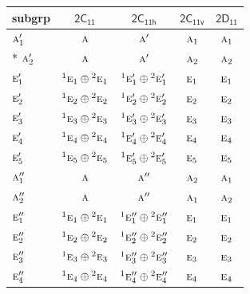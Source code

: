 \documentclass[10pt,a4paper]{article}
\numberwithin{equation}{section}
\newcommand{\grp}[1]{\mathsf{#1}}
\newcommand{\irr}[1]{\text{\normalfont\scshape #1}}
\newcommand{\conjpair}[1]{{}^{#1}}
\begin{document}
{\small\begin{longtable}{@{}lcccc@{}}\toprule
subgrp & \href{2C11.pdf}{$\grp{2C_{11}}$} & \href{2C11h.pdf}{$\grp{2C_{11h}}$} & \href{2C11v.pdf}{$\grp{2C_{11v}}$} & \href{2D11.pdf}{$\grp{2D_{11}}$}\\\midrule\endhead
\bottomrule\endfoot\endlastfoot
$\irr{a}_{1}'$ & $\irr{a}$ & $\irr{a}'$ & $\irr{a}_{1}$ & $\irr{a}_{1}$\\*
$\irr{a}_{2}'$ & $\irr{a}$ & $\irr{a}'$ & $\irr{a}_{2}$ & $\irr{a}_{2}$\\
$\irr{e}_{1}'$ & $\conjpair{1}\irr{e}_{1}\oplus \conjpair{2}\irr{e}_{1}$ & $\conjpair{1}\irr{e}_{1}'\oplus \conjpair{2}\irr{e}_{1}'$ & $\irr{e}_{1}$ & $\irr{e}_{1}$\\
$\irr{e}_{2}'$ & $\conjpair{1}\irr{e}_{2}\oplus \conjpair{2}\irr{e}_{2}$ & $\conjpair{1}\irr{e}_{2}'\oplus \conjpair{2}\irr{e}_{2}'$ & $\irr{e}_{2}$ & $\irr{e}_{2}$\\
$\irr{e}_{3}'$ & $\conjpair{1}\irr{e}_{3}\oplus \conjpair{2}\irr{e}_{3}$ & $\conjpair{1}\irr{e}_{3}'\oplus \conjpair{2}\irr{e}_{3}'$ & $\irr{e}_{3}$ & $\irr{e}_{3}$\\
$\irr{e}_{4}'$ & $\conjpair{1}\irr{e}_{4}\oplus \conjpair{2}\irr{e}_{4}$ & $\conjpair{1}\irr{e}_{4}'\oplus \conjpair{2}\irr{e}_{4}'$ & $\irr{e}_{4}$ & $\irr{e}_{4}$\\
$\irr{e}_{5}'$ & $\conjpair{1}\irr{e}_{5}\oplus \conjpair{2}\irr{e}_{5}$ & $\conjpair{1}\irr{e}_{5}'\oplus \conjpair{2}\irr{e}_{5}'$ & $\irr{e}_{5}$ & $\irr{e}_{5}$\\
$\irr{a}_{1}''$ & $\irr{a}$ & $\irr{a}''$ & $\irr{a}_{2}$ & $\irr{a}_{1}$\\
$\irr{a}_{2}''$ & $\irr{a}$ & $\irr{a}''$ & $\irr{a}_{1}$ & $\irr{a}_{2}$\\
$\irr{e}_{1}''$ & $\conjpair{1}\irr{e}_{1}\oplus \conjpair{2}\irr{e}_{1}$ & $\conjpair{1}\irr{e}_{1}''\oplus \conjpair{2}\irr{e}_{1}''$ & $\irr{e}_{1}$ & $\irr{e}_{1}$\\
$\irr{e}_{2}''$ & $\conjpair{1}\irr{e}_{2}\oplus \conjpair{2}\irr{e}_{2}$ & $\conjpair{1}\irr{e}_{2}''\oplus \conjpair{2}\irr{e}_{2}''$ & $\irr{e}_{2}$ & $\irr{e}_{2}$\\
$\irr{e}_{3}''$ & $\conjpair{1}\irr{e}_{3}\oplus \conjpair{2}\irr{e}_{3}$ & $\conjpair{1}\irr{e}_{3}''\oplus \conjpair{2}\irr{e}_{3}''$ & $\irr{e}_{3}$ & $\irr{e}_{3}$\\
$\irr{e}_{4}''$ & $\conjpair{1}\irr{e}_{4}\oplus \conjpair{2}\irr{e}_{4}$ & $\conjpair{1}\irr{e}_{4}''\oplus \conjpair{2}\irr{e}_{4}''$ & $\irr{e}_{4}$ & $\irr{e}_{4}$\\

\end{longtable}}
\end{document}
